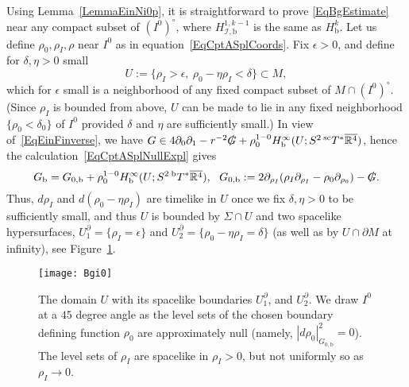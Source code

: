 \documentclass[reqno,11pt,letterpaper]{amsart}
\numberwithin{equation}{section}
\numberwithin{figure}{section}
\theoremstyle{definition}
\theoremstyle{remark}
\newcommand{\ms}{\mathscr}
\newcommand{\scri}{\ms I}
\newcommand{\R}{\mathbb{R}}
\newcommand{\slG}{\slashed{G}{}}
\newcommand{\eps}{\epsilon}
\newcommand{\ol}{\overline}
\newcommand{\pa}{\partial}
\newcommand{\bop}{{\mathrm{b}}}
\newcommand{\scl}{{\mathrm{sc}}}
\newcommand{\Tb}{{}^{\bop}T}
\newcommand{\Tsc}{{}^{\scl}T}
\newcommand{\Hb}{H_{\bop}}
\newcommand{\Hscrib}{H_{\scri,\bop}}
\begin{document}
Using Lemma~\ref{LemmaEinNi0p}, it is straightforward to prove \eqref{EqBgEstimate} near any compact subset of $(I^0)^\circ$, where $\Hscrib^{1,k-1}$ is the same as $\Hb^k$. Let us define $\rho_0,\rho_I,\rho$ near $I^0$ as in equation~\eqref{EqCptASplCoords}. Fix $\eps>0$, and define for $\delta,\eta>0$ small
\[
  U := \{ \rho_I>\eps,\ \rho_0-\eta\rho_I<\delta \} \subset M,
\]
which for $\eps$ small is a neighborhood of any fixed compact subset of $M\cap (I^0)^\circ$. (Since $\rho_I$ is bounded from above, $U$ can be made to lie in any fixed neighborhood $\{\rho_0<\delta_0\}$ of $I^0$ provided $\delta$ and $\eta$ are sufficiently small.) In view of~\eqref{EqEinFinverse}, we have $G\in 4\pa_0\pa_1-r^{-2}\slG+\rho_0^{1-0}\Hb^\infty(U;S^2\,\Tsc^*\ol{\R^4})$, hence the calculation~\eqref{EqCptASplNullExpl} gives
\begin{equation}
\label{EqBgApproxMetric}
  G_\bop=G_{0,\bop} + \rho_0^{1-0}\Hb^\infty(U;S^2\,\Tb^*\ol{\R^4}),\ \ 
  G_{0,\bop} := 2\pa_{\rho_I}(\rho_I\pa_{\rho_I}-\rho_0\pa_{\rho_0})-\slG.
\end{equation}
Thus, $d\rho_I$ and $d(\rho_0-\eta\rho_I)$ are timelike in $U$ once we fix $\delta,\eta>0$ to be sufficiently small, and thus $U$ is bounded by $\Sigma\cap U$ and two spacelike hypersurfaces, $U^\pa_1=\{\rho_I=\eps\}$ and $U^\pa_2=\{\rho_0-\eta\rho_I=\delta\}$ (as well as by $U\cap\pa M$ at infinity), see Figure~\ref{FigBgi0}.

\begin{figure}[!ht]
\texttt{[image: Bgi0]}
\caption{The domain $U$ with its spacelike boundaries $U_1^\pa$, and $U_2^\pa$. We draw $I^0$ at a $45$ degree angle as the level sets of the chosen boundary defining function $\rho_0$ are approximately null (namely, $|d\rho_0|_{G_{0,\bop}}^2=0$). The level sets of $\rho_I$ are spacelike in $\rho_I>0$, but not uniformly so as $\rho_I\to 0$.}
\label{FigBgi0}
\end{figure}
\end{document}

